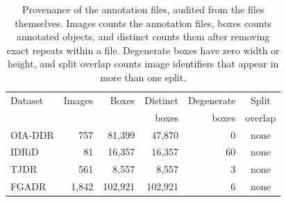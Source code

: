 \begin{table}[htbp]
\centering
\caption{Provenance of the annotation files, audited from the files themselves. Images counts the annotation files, boxes counts annotated objects, and distinct counts them after removing exact repeats within a file. Degenerate boxes have zero width or height, and split overlap counts image identifiers that appear in more than one split.}
\label{tab:xml_provenance}
\footnotesize
\setlength{\tabcolsep}{4pt}
\begin{tabular}{lrrrrc}
\toprule
Dataset & Images & Boxes & Distinct & Degenerate & Split \\
 & & & boxes & boxes & overlap \\
\midrule
OIA-DDR & 757 & 81{,}399 & 47{,}870 & 0 & none \\
IDRiD & 81 & 16{,}357 & 16{,}357 & 60 & none \\
TJDR & 561 & 8{,}557 & 8{,}557 & 3 & none \\
FGADR & 1{,}842 & 102{,}921 & 102{,}921 & 6 & none \\
\bottomrule
\end{tabular}
\end{table}
